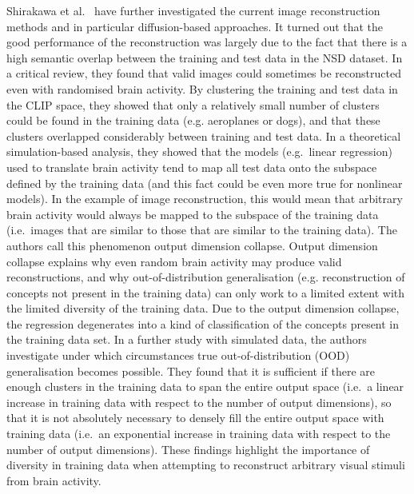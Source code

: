 Shirakawa et al.~\cite{shirakawaSpuriousReconstructionBrain2024} have further investigated the current image reconstruction methods and in particular diffusion-based approaches. It turned out that the good performance of the reconstruction was largely due to the fact that there is a high semantic overlap between the training and test data in the NSD dataset. In a critical review, they found that valid images could sometimes be reconstructed even with randomised brain activity. By clustering the training and test data in the CLIP space, they showed that only a relatively small number of clusters could be found in the training data (e.g. aeroplanes or dogs), and that these clusters overlapped considerably between training and test data. In a theoretical simulation-based analysis, they showed that the models (e.g.\ linear regression) used to translate brain activity tend to map all test data onto the subspace defined by the training data (and this fact could be even more true for nonlinear models). In the example of image reconstruction, this would mean that arbitrary brain activity would always be mapped to the subspace of the training data (i.e.\ images that are similar to those that are similar to the training data). The authors call this phenomenon output dimension collapse. Output dimension collapse explains why even random brain activity may produce valid reconstructions, and why out-of-distribution generalisation (e.g. reconstruction of concepts not present in the training data) can only work to a limited extent with the limited diversity of the training data. Due to the  output dimension collapse, the regression degenerates into a kind of classification of the concepts present in the training data set. In a further study with simulated data, the authors investigate under which circumstances true out-of-distribution (OOD) generalisation becomes possible. They found that it is sufficient if there are enough clusters in the training data to span the entire output space (i.e.\ a linear increase in training data with respect to the number of output dimensions), so that it is not absolutely necessary to densely fill the entire output space with training data (i.e.\ an exponential increase in training data with respect to the number of output dimensions). These findings highlight the importance of diversity in training data when attempting to reconstruct arbitrary visual stimuli from brain activity.

